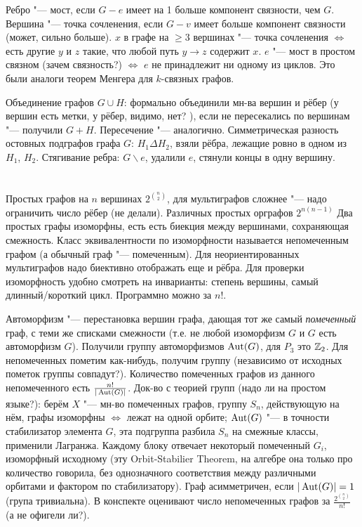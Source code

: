 Ребро "--- мост, если $G-e$ имеет на 1 больше компонент связности, чем $G$.
Вершина "--- точка сочленения, если $G-v$ имеет больше компонент связности (может, сильно больше).
$x$ в графе на $\ge 3$ вершинах "--- точка сочленения $\iff$ есть другие $y$ и $z$ такие, что любой путь $y\to z$ содержит $x$.
$e$ "--- мост в простом связном (\TODO зачем связность?) $\iff$ $e$ не принадлежит ни одному из циклов.
Это были аналоги теорем Менгера для $k$-связных графов.

Объединение графов $G\cup H$: формально объединили мн-ва вершин и рёбер (у вершин есть метки, у рёбер, видимо, нет? \TODO), если не пересекались по вершинам "--- получили $G+H$.
Пересечение "--- аналогично.
Симметрическая разность остовных подграфов графа $G$: $H_1 \Delta H_2$, взяли рёбра, лежащие ровно в одном из $H_1$, $H_2$.
Стягивание ребра: $G \backslash e$, удалили $e$, стянули концы в одну вершину.

\section{} %
Простых графов на $n$ вершинах $2^{\binom{n}{2}}$, для мультиграфов сложнее "--- надо ограничить число рёбер (не делали).
Различных простых орграфов $2^{n(n-1)}$
Два простых графы изоморфны, есть есть биекция между вершинами, сохраняющая смежность.
Класс эквивалентности по изоморфности называется непомеченным графом (а обычный граф "--- помеченным).
Для неориентированных мультиграфов надо биективно отображать еще и рёбра.
Для проверки изоморфность удобно смотреть на инварианты: степень вершины, самый длинный/короткий цикл.
Программно можно за $n!$.

Автоморфизм "--- перестановка вершин графа, дающая тот же самый \textit{помеченный} граф, с теми же списками смежности (т.е. не любой изоморфизм $G$ и $G$ есть автоморфизм $G$).
Получили группу автоморфизмов $\operatorname{Aut}(G)$, для $P_3$ это $\mathbb{Z}_2$.
Для непомеченных пометим как-нибудь, получим группу (\TODO независимо от исходных пометок группы совпадут?).
Количество помеченных графов из данного непомеченного есть $\frac{n!}{|\operatorname{Aut}(G)|}$.
Док-во с теорией групп (\TODO надо ли на простом языке?): берём $X$ "--- мн-во помеченных графов, группу $S_n$, действующую на нём, графы изоморфны $\iff$ лежат на одной орбите;
$\operatorname{Aut}(G)$ "--- в точности стабилизатор элемента $G$, эта подгруппа разбила $S_n$ на смежные классы, применили Лагранжа.
Каждому блоку отвечает некоторый помеченный $G_i$, изоморфный исходному (эту Orbit-Stabilier Theorem, на алгебре она только про количество говорила,
без однозначного соответствия между различными орбитами и фактором по стабилизатору).
Граф асимметричен, если $|\operatorname{Aut}(G)|=1$ (група тривиальна).
В конспекте оценивают число непомеченных графов за $\frac{2^{\binom{n}{2}}}{n!}$ (\TODO а не офигели ли?).

